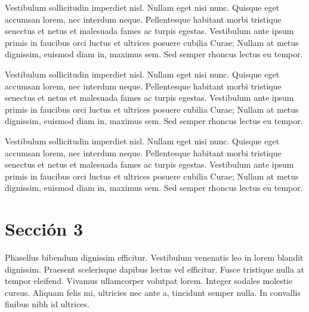 	
	
	
	
	
	

	
	Vestibulum sollicitudin imperdiet nisl. Nullam eget nisi nunc. Quisque eget accumsan lorem, nec interdum neque. Pellentesque habitant morbi tristique senectus et netus et malesuada fames ac turpis egestas. Vestibulum ante ipsum primis in faucibus orci luctus et ultrices posuere cubilia Curae; Nullam at metus dignissim, euismod diam in, maximus sem. Sed semper rhoncus lectus eu tempor.
	
	Vestibulum sollicitudin imperdiet nisl. Nullam eget nisi nunc. Quisque eget accumsan lorem, nec interdum neque. Pellentesque habitant morbi tristique senectus et netus et malesuada fames ac turpis egestas. Vestibulum ante ipsum primis in faucibus orci luctus et ultrices posuere cubilia Curae; Nullam at metus dignissim, euismod diam in, maximus sem. Sed semper rhoncus lectus eu tempor.
	
	Vestibulum sollicitudin imperdiet nisl. Nullam eget nisi nunc. Quisque eget accumsan lorem, nec interdum neque. Pellentesque habitant morbi tristique senectus et netus et malesuada fames ac turpis egestas. Vestibulum ante ipsum primis in faucibus orci luctus et ultrices posuere cubilia Curae; Nullam at metus dignissim, euismod diam in, maximus sem. Sed semper rhoncus lectus eu tempor.
	
	\section{Sección 3}
	
	Phasellus bibendum dignissim efficitur. Vestibulum venenatis leo in lorem blandit dignissim. Praesent scelerisque dapibus lectus vel efficitur. Fusce tristique nulla at tempor eleifend. Vivamus ullamcorper volutpat lorem. Integer sodales molestie cursus. Aliquam felis mi, ultricies nec ante a, tincidunt semper nulla. In convallis finibus nibh id ultrices.

